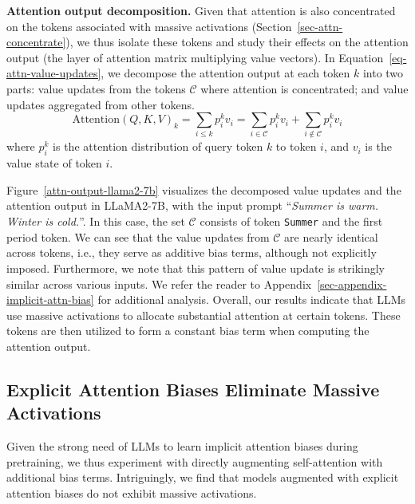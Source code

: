 \documentclass[10pt]{article}
\begin{document}
\textbf{Attention output decomposition.} Given that attention is also concentrated on the tokens associated with massive activations (Section~\ref{sec-attn-concentrate}), we thus isolate these tokens and study their effects on the attention output (the layer of attention matrix multiplying value vectors). In Equation~\ref{eq-attn-value-updates}, we decompose the attention output at each token $k$ into two parts: value updates from the tokens $\mathcal{C}$ where attention is concentrated; and value updates aggregated from other tokens. 
\begin{equation}\label{eq-attn-value-updates}
    \text{Attention}(Q, K, V)_{k} = \sum_{i\le k}p^{k}_{i}v_{i}=\sum_{i\in \mathcal{C}}p^{k}_{i}v_{i}+\sum_{i\notin \mathcal{C}}p^{k}_{i}v_{i}
\end{equation}
where $p^{k}_{i}$ is the attention distribution of query token $k$ to token $i$, and $v_{i}$ is the value state of token $i$. 

Figure~\ref{attn-output-llama2-7b} visualizes the decomposed value updates and the attention output in LLaMA2-7B, with the input prompt ``\textsl{Summer is warm. Winter is cold.}''. In this case, the set $\mathcal{C}$ consists of token \texttt{Summer} and the first period token. We can see that the value updates from $\mathcal{C}$ are nearly identical across tokens, i.e., they serve as additive bias terms, although not explicitly imposed. Furthermore, we note that this pattern of value update is strikingly similar across various inputs. We refer the reader to Appendix~\ref{sec-appendix-implicit-attn-bias} for additional analysis. Overall, our results indicate that LLMs use massive activations to allocate substantial attention at certain tokens. These tokens are then utilized to form a constant bias term when computing the attention output.



\subsection{Explicit Attention Biases Eliminate Massive Activations}\label{sec-explicit-attn-bias}

Given the strong need of LLMs to learn implicit attention biases during pretraining, we thus experiment with directly augmenting self-attention with additional bias terms. Intriguingly, we find that models augmented with explicit attention biases do not exhibit massive activations.
\end{document}

